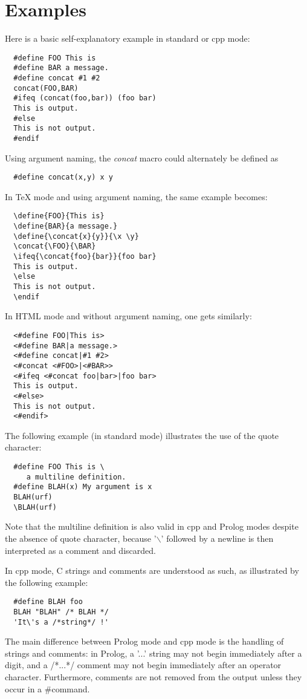 \section{Examples}
Here is a basic self-explanatory example in standard or cpp mode:
\begin{verbatim}
  #define FOO This is
  #define BAR a message.
  #define concat #1 #2
  concat(FOO,BAR)
  #ifeq (concat(foo,bar)) (foo bar)
  This is output.
  #else
  This is not output.
  #endif
\end{verbatim}
Using argument naming, the {\it concat} macro could alternately be defined
as
\begin{verbatim}
  #define concat(x,y) x y
\end{verbatim}
In TeX mode and using argument naming, the same example becomes:
\begin{verbatim}
  \define{FOO}{This is}
  \define{BAR}{a message.}
  \define{\concat{x}{y}}{\x \y}
  \concat{\FOO}{\BAR}
  \ifeq{\concat{foo}{bar}}{foo bar}
  This is output.
  \else
  This is not output.
  \endif
\end{verbatim}
In HTML mode and without argument naming, one gets similarly:
\begin{verbatim}
  <#define FOO|This is>
  <#define BAR|a message.>
  <#define concat|#1 #2>
  <#concat <#FOO>|<#BAR>>
  <#ifeq <#concat foo|bar>|foo bar>
  This is output.
  <#else>
  This is not output.
  <#endif>
\end{verbatim}
The following example (in standard mode) illustrates the use of 
the quote character:
\begin{verbatim}
  #define FOO This is \
     a multiline definition.
  #define BLAH(x) My argument is x
  BLAH(urf)
  \BLAH(urf)
\end{verbatim}
Note that the multiline definition is also valid in cpp and Prolog
modes despite the absence of quote character, because '$\backslash$' followed
by a newline is then interpreted as a comment and discarded.


In cpp mode, C strings and comments are understood as such, as illustrated
by the following example:
\begin{verbatim}
  #define BLAH foo
  BLAH "BLAH" /* BLAH */
  'It\'s a /*string*/ !'
\end{verbatim}
The main difference between Prolog mode and cpp mode is the handling of
strings and comments: in Prolog, a '...' string may not begin
immediately after a digit, and a /*...*/ comment may not begin immediately
after an operator character. Furthermore, comments are not removed from
the output unless they occur in a \#command.


